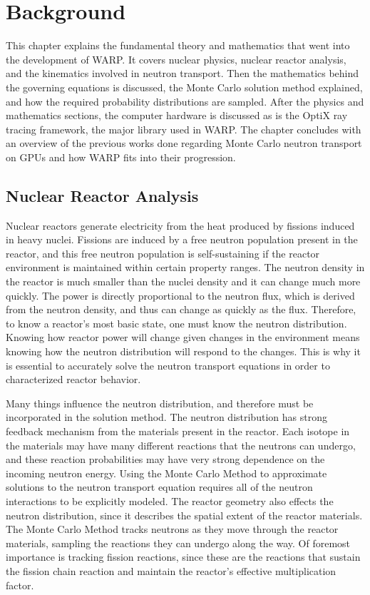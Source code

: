 \chapter{Background}
\label{chap:background}

This chapter explains the fundamental theory and mathematics that went into the development of WARP.  It covers nuclear physics, nuclear reactor analysis, and the kinematics involved in neutron transport.  Then the mathematics behind the governing equations is discussed, the Monte Carlo solution method explained, and how the required probability distributions are sampled.  After the physics and mathematics sections, the computer hardware is discussed as is the OptiX ray tracing framework, the major library used in WARP.  The chapter concludes with an overview of the previous works done regarding Monte Carlo neutron transport on GPUs and how WARP fits into their progression.

\section{Nuclear Reactor Analysis}

Nuclear reactors generate electricity from the heat produced by fissions induced in heavy nuclei.  Fissions are induced by a free neutron population present in the reactor, and this free neutron population is self-sustaining if the reactor environment is maintained within certain property ranges.  The neutron density in the reactor is much smaller than the nuclei density and it can change much more quickly.  The power is directly proportional to the neutron flux, which is derived from the neutron density, and thus can change as quickly as the flux.  Therefore, to know a reactor's most basic state, one must know the neutron distribution.  Knowing how reactor power will change given changes in the environment means knowing how the neutron distribution will respond to the changes.  This is why it is essential to accurately solve the neutron transport equations in order to characterized reactor behavior. 

Many things influence the neutron distribution, and therefore must be incorporated in the solution method.  The neutron distribution has strong feedback mechanism from the materials present in the reactor.  Each isotope in the materials may have many different reactions that the neutrons can undergo, and these reaction probabilities may have very strong dependence on the incoming neutron energy.  Using the Monte Carlo Method to approximate solutions to the neutron transport equation requires all of the neutron interactions to be explicitly modeled.  The reactor geometry also effects the neutron distribution, since it describes the spatial extent of the reactor materials.   The Monte Carlo Method tracks neutrons as they move through the reactor materials, sampling the reactions they can undergo along the way.  Of foremost importance is tracking fission reactions, since these are the reactions that sustain the fission chain reaction and maintain the reactor's effective multiplication factor.

